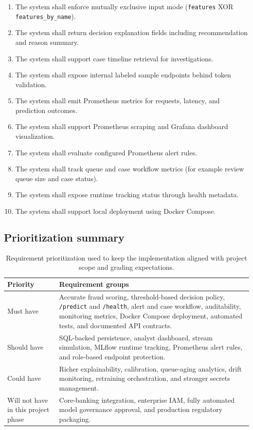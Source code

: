 \documentclass[11pt]{article}
\newcommand{\code}[1]{\texttt{#1}}
\begin{document}
\begin{enumerate}[label=FR-\arabic*:, leftmargin=3.2em]
  \item The system shall enforce mutually exclusive input mode (\code{features} XOR \code{features_by_name}).
  \item The system shall return decision explanation fields including recommendation and reason summary.
  \item The system shall support case timeline retrieval for investigations.
  \item The system shall expose internal labeled sample endpoints behind token validation.
  \item The system shall emit Prometheus metrics for requests, latency, and prediction outcomes.
  \item The system shall support Prometheus scraping and Grafana dashboard visualization.
  \item The system shall evaluate configured Prometheus alert rules.
  \item The system shall track queue and case workflow metrics (for example review queue size and case status).
  \item The system shall expose runtime tracking status through health metadata.
  \item The system shall support local deployment using Docker Compose.
\end{enumerate}

\subsection*{Prioritization summary}
\begin{table}[H]
\small
\centering
\begin{tabularx}{\textwidth}{p{}X}
\toprule
Priority & Requirement groups \\
\midrule
Must have & Accurate fraud scoring, threshold-based decision policy, \code{/predict} and \code{/health}, alert and case workflow, auditability, monitoring metrics, Docker Compose deployment, automated tests, and documented API contracts. \\
Should have & SQL-backed persistence, analyst dashboard, stream simulation, MLflow runtime tracking, Prometheus alert rules, and role-based endpoint protection. \\
Could have & Richer explainability, calibration, queue-aging analytics, drift monitoring, retraining orchestration, and stronger secrets management. \\
Will not have in this project phase & Core-banking integration, enterprise IAM, fully automated model governance approval, and production regulatory packaging. \\
\bottomrule
\end{tabularx}
\caption{Requirement prioritization used to keep the implementation aligned with project scope and grading expectations.}
\end{table}
\end{document}
